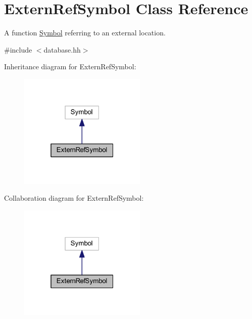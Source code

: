 \hypertarget{class_extern_ref_symbol}{}\section{Extern\+Ref\+Symbol Class Reference}
\label{class_extern_ref_symbol}


A function \mbox{\hyperlink{class_symbol}{Symbol}} referring to an external location.  




{\ttfamily \#include $<$database.\+hh$>$}



Inheritance diagram for Extern\+Ref\+Symbol\+:
\nopagebreak
\begin{figure}[H]
\begin{center}
\leavevmode
\includegraphics[width=172pt]{class_extern_ref_symbol__inherit__graph}
\end{center}
\end{figure}


Collaboration diagram for Extern\+Ref\+Symbol\+:
\nopagebreak
\begin{figure}[H]
\begin{center}
\leavevmode
\includegraphics[width=172pt]{class_extern_ref_symbol__coll__graph}
\end{center}
\end{figure}
